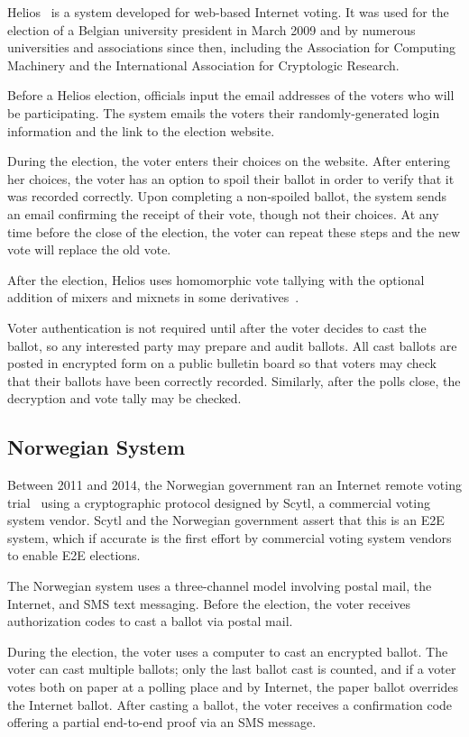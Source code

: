 Helios~\cite{adida2008,adida2009} is a system developed for web-based
Internet voting. It was used for the election of a Belgian university
president in March 2009 and by numerous universities and associations
since then, including the Association for Computing Machinery and the
International Association for Cryptologic Research.

Before a Helios election, officials input the email addresses of the
voters who will be participating. The system emails the voters their
randomly-generated login information and the link to the election
website.

During the election, the voter enters their choices on the
website. After entering her choices, the voter has an option to spoil
their ballot in order to verify that it was recorded correctly. Upon
completing a non-spoiled ballot, the system sends an email confirming
the receipt of their vote, though not their choices. At any time
before the close of the election, the voter can repeat these steps and
the new vote will replace the old vote.

After the election, Helios uses homomorphic vote tallying with the
optional addition of mixers and mixnets in some
derivatives~\cite{bulens2011,tsoukalas2013}.

Voter authentication is not required until after the voter decides to
cast the ballot, so any interested party may prepare and audit
ballots. All cast ballots are posted in encrypted form on a public
bulletin board so that voters may check that their ballots have been
correctly recorded. Similarly, after the polls close, the decryption
and vote tally may be checked.

\subsection{Norwegian System}

Between 2011 and 2014, the Norwegian government ran an Internet remote
voting trial~\cite{gjosteen2012} using a cryptographic protocol
designed by Scytl, a commercial voting system vendor. Scytl and the
Norwegian government assert that this is an E2E system, which if
accurate is the first effort by commercial voting system vendors to
enable E2E elections.

The Norwegian system uses a three-channel model involving postal mail,
the Internet, and SMS text messaging. Before the election, the voter
receives authorization codes to cast a ballot via postal mail.

During the election, the voter uses a computer to cast an encrypted
ballot. The voter can cast multiple ballots; only the last ballot cast
is counted, and if a voter votes both on paper at a polling place and
by Internet, the paper ballot overrides the Internet ballot. After
casting a ballot, the voter receives a confirmation code offering a
partial end-to-end proof via an SMS message.


